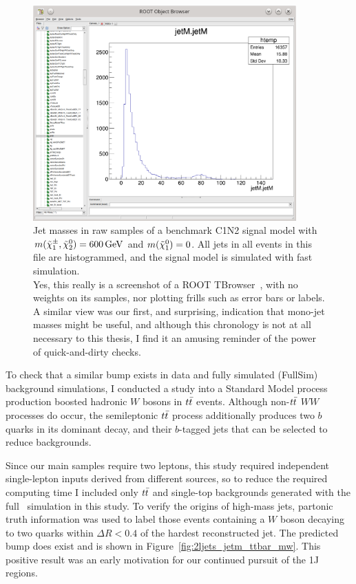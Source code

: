 \begin{figure}[tp]
\centering
\includegraphics[width=0.9\textwidth]{figures/2ljets_jetm_c1n2_600_0_tbrowser.png}
\caption[
Jet masses in raw samples of a benchmark C1N2 signal model
]{%
Jet masses in raw samples of a benchmark C1N2 signal model with
$m(\chargino_1,\neutralino_2) = 600\,\eV[G]$ and
$m(\neutralino_1) = 0$.
All jets in all events in this file are histogrammed,
and the signal model is simulated with fast simulation.
\\[0.5em]
Yes, this really is a screenshot of a ROOT TBrowser~\cite{ROOT}, with no
weights on its samples, nor plotting frills such as error bars or labels.
A similar view was our first, and surprising, indication that mono-jet masses
might be useful, and although this chronology is not at all necessary to this
thesis, I find it an amusing reminder of the power of quick-and-dirty checks.
}
\label{fig:2ljets_jetm_c1n2_600_0}
\end{figure}

To check that a similar bump exists in data and fully simulated (FullSim)
background simulations, I conducted a study into a Standard Model process
production boosted hadronic $W$ bosons in $\ttbar$ events.
Although non-$\ttbar$ $WW$ processes do occur, the semileptonic $\ttbar$
process additionally produces two $b$ quarks in its dominant decay, and their
$b$-tagged jets that can be selected to reduce backgrounds.

Since our main samples require two leptons, this study required independent
single-lepton inputs derived from different sources, so to reduce the required
computing time I included only $\ttbar$ and single-top backgrounds generated
with the full \atlas\ simulation in this study.
To verify the origins of high-mass jets, partonic truth information was used
to label those events containing a $W$ boson decaying to two quarks within
$\Delta R < 0.4$ of the hardest reconstructed jet.
The predicted bump does exist and is shown in
Figure~\ref{fig:2ljets_jetm_ttbar_mw}.
This positive result was an early motivation for our continued pursuit of the
1J regions.

